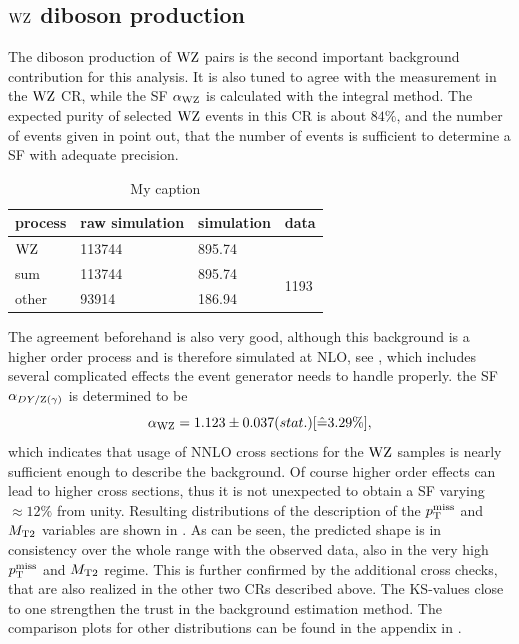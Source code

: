 \subsection{$\mathrm{W}\mathrm{Z}$ diboson production}
The diboson production of $\mathrm{W}\mathrm{Z}$ pairs is the second important background contribution for this analysis. It is also tuned to agree with the measurement in the $\mathrm{W}\mathrm{Z}$ CR, while the SF $\alpha_{\mathrm{W}\mathrm{Z}}$ is calculated with the integral method. The expected purity of selected $\mathrm{W}\mathrm{Z}$ events in this CR is about $84\%$, and the number of events given in  point out, that the number of events is sufficient to determine a SF with adequate precision.
\begin{table}[tbp]
 \centering
 \caption{My caption}
 \label{tab:CRWZ}
 \begin{tabular}{llll}
  process  & raw simulation & simulation & data                  \\\hline
  $\mathrm{W}\mathrm{Z}$ & 113744         & 895.74     &                       \\\hline\hline
  sum      & 113744         & 895.74     & \multirow{2}{*}{1193} \\
  other    & 93914          & 186.94     &                       
 \end{tabular}
\end{table}
The agreement beforehand is also very good, although this background is a higher order process and is therefore simulated at NLO, see , which includes several complicated effects the event generator needs to handle properly. the SF $\alpha_{DY/\mathrm{Z}(\gamma)}$ is determined to be
\begin{equation}\label{eq:AlphaWZ}
 \alpha_{\mathrm{W}\mathrm{Z}}=1.123 \pm 0.037 (stat.) [\hat{=}3.29\%],
\end{equation}
which indicates that usage of NNLO cross sections for the $\mathrm{W}\mathrm{Z}$ samples is nearly sufficient enough to describe the background. Of course higher order effects can lead to higher cross sections, thus it is not unexpected to obtain a SF varying $\approx12\%$ from unity. Resulting distributions of the description of the $p_{\mathrm{T}}^\text{miss}$ and $M_{\mathrm{T2}}$ variables are shown in . As can be seen, the predicted shape is in consistency over the whole range with the observed data, also in the very high $p_{\mathrm{T}}^\text{miss}$ and $M_{\mathrm{T2}}$ regime. This is further confirmed by the additional cross checks, that are also realized in the other two CRs described above. The KS-values close to one strengthen the trust in the background estimation method. The comparison plots for other distributions can be found in the appendix in .
